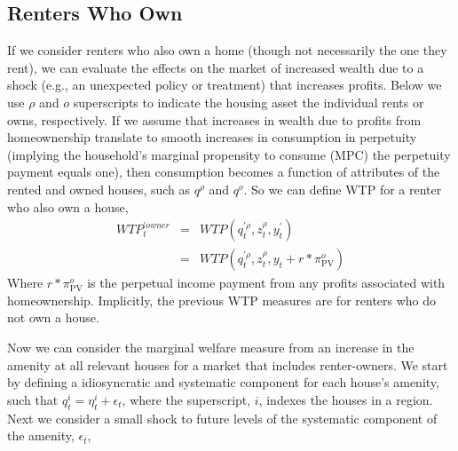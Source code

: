 \documentclass[ecta,nameyear,draft]{econsocart}
\theoremstyle{plain}
\theoremstyle{remark}
\begin{document}
\subsection{Renters Who Own}
If we consider renters who also own a home (though not necessarily the one they rent), we can evaluate the effects on the market of increased wealth due to a shock (e.g., an unexpected policy or treatment) that increases profits. Below we use $\rho$ and $o$ superscripts to indicate the housing asset the individual rents or owns, respectively. If we assume that increases in wealth due to profits from homeownership translate to smooth increases in consumption in perpetuity (implying the household's marginal propensity to consume (MPC) the perpetuity payment equals one), then consumption becomes a function of attributes of the rented and owned houses, such as $q^\rho$ and $q^o$. So we can define WTP for a renter who also own a house,
\begin{eqnarray*}
	\mathit{WTP}_t^{\prime\mathit{owner}}&=&\mathit{WTP}(q_t^{\prime \rho},z_t^\rho,y_t^\prime)\\
	&=&\mathit{WTP}(q_t^{\prime \rho},z_t^\rho,y_t+r*\pi^o_{\mathrm{PV}})
\end{eqnarray*}
Where $r*\pi_{\mathrm{PV}}^o$ is the perpetual income payment from any profits associated with homeownership. Implicitly, the previous WTP measures are for renters who do not own a house.

Now we can consider the marginal welfare measure from an increase in the amenity at all relevant houses for a market that includes renter-owners. We start by defining a idiosyncratic and systematic component for each house's amenity, such that $q_{t}^i=\eta_{t}^i+\epsilon_t$, where the superscript, $i$, indexes the houses in a region. Next we consider a small shock to future levels of the systematic component of the amenity, $\epsilon_t$,%
\end{document}
